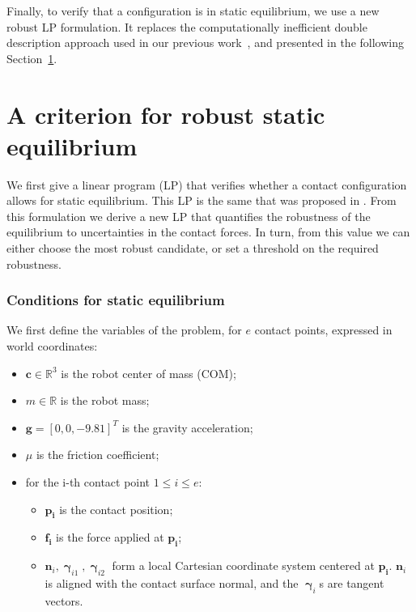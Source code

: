 \documentclass[journal]{IEEEtran}
\begin{document}
Finally, to verify that a configuration is in static equilibrium, we use a new robust LP formulation. It replaces the computationally inefficient double description
approach used in our previous work~\cite{tonneauisrr15}, and presented in the following Section~\ref{sec:Equil}.





\section{A criterion for robust static equilibrium}
\label{sec:Equil}

We first give a linear program (LP) that verifies whether a contact configuration allows for static equilibrium. This LP is the same that was proposed in  \citep{Prete2016}.
From this formulation we derive a new LP that quantifies the robustness of the equilibrium to uncertainties in the contact forces.
In turn, from this value we can either choose the most robust candidate, or set a threshold on the required robustness. 


\subsubsection{Conditions for static equilibrium}
We first define the variables of the problem, for $e$ contact points, expressed in world coordinates:
\begin{itemize}
\item $\mathbf{c} \in \mathbb{R}^3$ is the robot center of mass (COM);
\item $m \in \mathbb{R}$ is the robot mass;
\item $\mathbf{g} = [0,0,-9.81]^T$ is the gravity acceleration;
\item $\mu$ is the friction coefficient;
\item for the i-th contact point $1 \leq i \leq e$:
	\begin{itemize}
	\item $\mathbf{p_i}$ is the contact position;
	\item $\mathbf{f_i}$ is the force applied at $\mathbf{p_i}$;
	\item $\mathbf{n}_i,\mathbf{\boldsymbol\upgamma}_{i1},\mathbf{\boldsymbol\upgamma}_{i2}$ form a local Cartesian coordinate system centered at $\mathbf{p_i}$. $\mathbf{n}_i$ is aligned
	with the contact surface normal, and the $\mathbf{\boldsymbol\upgamma}_i$s are tangent vectors.
	\end{itemize}
\end{itemize}
\end{document}
